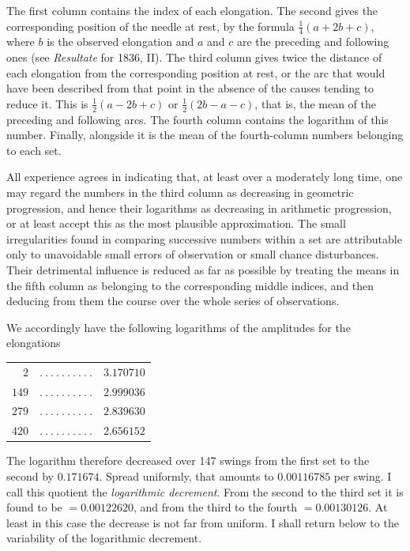 The first column contains the index of each elongation. The second gives the corresponding position of the needle at rest, by the formula $\tfrac14(a+2b+c)$, where $b$ is the observed elongation and $a$ and $c$ are the preceding and following ones (see \textit{Resultate} for 1836, II). The third column gives twice the distance of each elongation from the corresponding position at rest, or the arc that would have been described from that point in the absence of the causes tending to reduce it. This is $\tfrac12(a-2b+c)$ or $\tfrac12(2b-a-c)$, that is, the mean of the preceding and following arcs. The fourth column contains the logarithm of this number. Finally, alongside it is the mean of the fourth-column numbers belonging to each set.

All experience agrees in indicating that, at least over a moderately long time, one may regard the numbers in the third column as decreasing in geometric progression,
and hence their logarithms as decreasing in arithmetic progression, or at least accept this as the most plausible approximation. The small irregularities found in comparing successive numbers within a set are attributable only to unavoidable small errors of observation or small chance disturbances. Their detrimental influence is reduced as far as possible by treating the means in the fifth column as belonging to the corresponding middle indices, and then deducing from them the course over the whole series of observations.

We accordingly have the following logarithms of the amplitudes for the elongations
\begin{center}
\begin{tabular}{rcl}
$2$ & $.\ .\ .\ .\ .\ .\ .\ .\ .\ .$ & $3.170710$\\
$149$ & $.\ .\ .\ .\ .\ .\ .\ .\ .\ .$ & $2.999036$\\
$279$ & $.\ .\ .\ .\ .\ .\ .\ .\ .\ .$ & $2.839630$\\
$420$ & $.\ .\ .\ .\ .\ .\ .\ .\ .\ .$ & $2.656152$
\end{tabular}
\end{center}

The logarithm therefore decreased over 147 swings from the first set to the second by $0.171674$. Spread uniformly, that amounts to $0.00116785$ per swing. I call this quotient the \textit{logarithmic decrement}. From the second to the third set it is found to be $=0.00122620$, and from the third to the fourth $=0.00130126$. At least in this case the decrease is not far from uniform. I shall return below to the variability of the logarithmic decrement.

